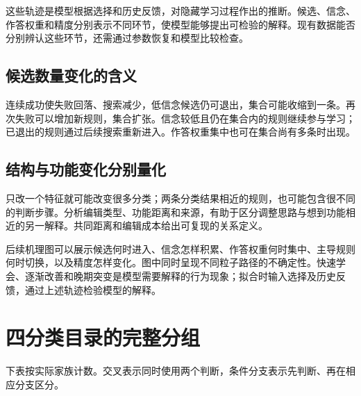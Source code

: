 \documentclass[12pt]{article}
\begin{document}
这些轨迹是模型根据选择和历史反馈，对隐藏学习过程作出的推断。候选、信念、作答权重和精度分别表示不同环节，使模型能够提出可检验的解释。现有数据能否分别辨认这些环节，还需通过参数恢复和模型比较检查。

\subsection{候选数量变化的含义}

连续成功使失败回落、搜索减少，低信念候选仍可退出，集合可能收缩到一条。再次失败可以增加新规则，集合扩张。信念较低且仍在集合内的规则继续参与学习；已退出的规则通过后续搜索重新进入。作答权重集中也可在集合尚有多条时出现。

\subsection{结构与功能变化分别量化}

只改一个特征就可能改变很多分类；两条分类结果相近的规则，也可能包含很不同的判断步骤。分析编辑类型、功能距离和来源，有助于区分调整思路与想到功能相近的另一解释。共同距离和编辑成本给出可复现的关系定义。

后续机理图可以展示候选何时进入、信念怎样积累、作答权重何时集中、主导规则何时切换，以及精度怎样变化。图中同时呈现不同粒子路径的不确定性。快速学会、逐渐改善和晚期突变是模型需要解释的行为现象；拟合时输入选择及历史反馈，通过上述轨迹检验模型的解释。

\appendix
\section{四分类目录的完整分组}
\label{app:catalogue}

下表按实际家族计数。交叉表示同时使用两个判断，条件分支表示先判断、再在相应分支区分。
\end{document}
